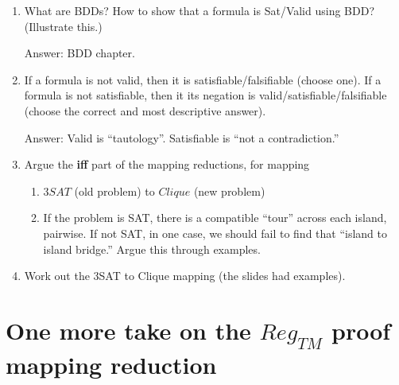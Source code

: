 \documentclass[10pt]{article}
\begin{document}
\begin{enumerate}
\item What are BDDs? How to show that a formula is Sat/Valid using BDD?
  (Illustrate this.)
    \begin{sf}
    Answer: BDD chapter.
  \end{sf}

\item If a formula is not valid, then it is satisfiable/falsifiable (choose one). If a formula is not satisfiable, then it its negation is
  valid/satisfiable/falsifiable (choose the correct and most
  descriptive answer).
      \begin{sf}
    Answer: Valid is ``tautology''. Satisfiable is ``not a contradiction.''
  \end{sf}
  
\item Argue the {\bf iff} part of the mapping reductions, for mapping
  \begin{enumerate}
  \item $3SAT$ (old problem) to $Clique$ (new problem)
  \item If the problem is SAT, there is a compatible ``tour'' across
    each island, pairwise. If not SAT, in one case, we should fail
    to find that ``island to island bridge.''
    Argue this through examples.
  \end{enumerate}

\item Work out the 3SAT to Clique mapping (the slides had examples).

\end{enumerate}

\clearpage

\section{One more take on the $Reg_{TM}$ proof mapping reduction}
\label{sec:sprintf}
\end{document}
